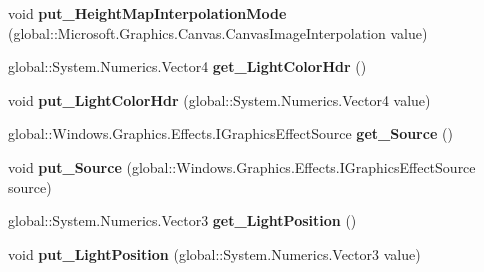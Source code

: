 \begin{DoxyCompactItemize}
void {\bfseries put\+\_\+\+Height\+Map\+Interpolation\+Mode} (global\+::\+Microsoft.\+Graphics.\+Canvas.\+Canvas\+Image\+Interpolation value)
\item 
\mbox{\label{interface_microsoft_1_1_graphics_1_1_canvas_1_1_effects_1_1_i_point_specular_effect_aacc55e5430acd3c3558aa6dcd81d9e2d}} 
global\+::\+System.\+Numerics.\+Vector4 {\bfseries get\+\_\+\+Light\+Color\+Hdr} ()
\item 
\mbox{\label{interface_microsoft_1_1_graphics_1_1_canvas_1_1_effects_1_1_i_point_specular_effect_a56095b0554464e0d6e21b17a156922a3}} 
void {\bfseries put\+\_\+\+Light\+Color\+Hdr} (global\+::\+System.\+Numerics.\+Vector4 value)
\item 
\mbox{\label{interface_microsoft_1_1_graphics_1_1_canvas_1_1_effects_1_1_i_point_specular_effect_a7d347512392c00b72ede242f641a7ba8}} 
global\+::\+Windows.\+Graphics.\+Effects.\+I\+Graphics\+Effect\+Source {\bfseries get\+\_\+\+Source} ()
\item 
\mbox{\label{interface_microsoft_1_1_graphics_1_1_canvas_1_1_effects_1_1_i_point_specular_effect_a40f9231628b1bfc8505b452e6bbab64b}} 
void {\bfseries put\+\_\+\+Source} (global\+::\+Windows.\+Graphics.\+Effects.\+I\+Graphics\+Effect\+Source source)
\item 
\mbox{\label{interface_microsoft_1_1_graphics_1_1_canvas_1_1_effects_1_1_i_point_specular_effect_a28209142148cfe71095fabeee5e18d5d}} 
global\+::\+System.\+Numerics.\+Vector3 {\bfseries get\+\_\+\+Light\+Position} ()
\item 
\mbox{\label{interface_microsoft_1_1_graphics_1_1_canvas_1_1_effects_1_1_i_point_specular_effect_aba11495a0ccc7ed46171a3d802361ec6}} 
void {\bfseries put\+\_\+\+Light\+Position} (global\+::\+System.\+Numerics.\+Vector3 value)
\item 

\end{DoxyCompactItemize}
